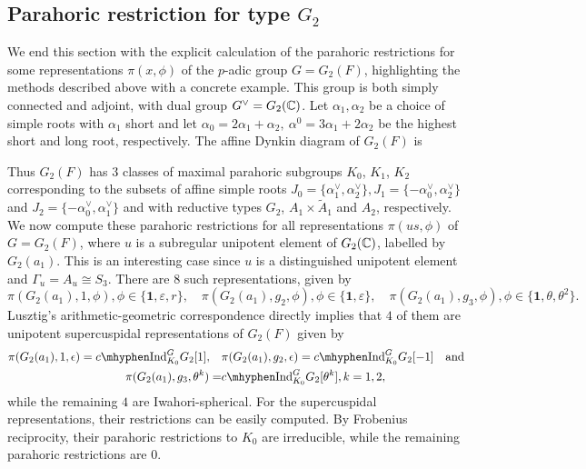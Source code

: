 \subsection{Parahoric restriction for type \texorpdfstring{$G_2$}{PDFstring}}
We end this section with the explicit calculation of the parahoric restrictions for some representations $\pi(x,\phi)$ of the $p$-adic group $G=G_2(F)$, highlighting the methods described above with a concrete example. This group is both simply connected and adjoint, with dual group $G^\vee=G_2(\mathbb{C})$. Let $\alpha_1,\alpha_2$ be a choice of simple roots with $\alpha_1$ short and let $\alpha_0=2\alpha_1+\alpha_2,\ \alpha^0=3\alpha_1+2\alpha_2$ be the highest short and long root, respectively. The affine Dynkin diagram of $G_2(F)$ is 
\begin{center}
\end{center}
Thus $G_2(F)$ has $3$ classes of maximal parahoric subgroups $K_0$, $K_1$, $K_2$ corresponding to the subsets of affine simple roots $J_0=\{\alpha^\vee_1,\alpha^\vee_2\}, J_1=\{-\alpha^\vee_0,\alpha^\vee_2\}$ and $J_2=\{-\alpha^\vee_0,\alpha^\vee_1\}$ and with reductive types $G_2$, $A_1\times \tilde{A}_1$ and $A_2$, respectively. We now compute these parahoric restrictions for all representations $\pi(us,\phi)$ of $G=G_2(F)$, where $u$ is a subregular unipotent element of $G_2(\mathbb{C})$, labelled by $G_2(a_1)$. This is an interesting case since $u$ is a distinguished unipotent element and $\Gamma_u=A_u\cong S_3$. There are $8$ such representations, given by 
$$\pi(G_2(a_1),1,\phi),\phi\in\{\mathbf{1},\varepsilon,r\},\quad\pi(G_2(a_1),g_2,\phi),\phi\in\{\mathbf{1},\varepsilon\},\quad\pi(G_2(a_1),g_3,\phi),\phi\in\{\mathbf{1},\theta,\theta^2\}.$$
Lusztig's arithmetic-geometric correspondence directly implies that $4$ of them are unipotent supercuspidal representations of $G_2(F)$ given by 
\begin{align*}
    \pi(G_2(a_1),1,\epsilon)=\cInd_{K_0}^{G}G_2[1],\quad&\pi(G_2(a_1),g_2,\epsilon)=\cInd_{K_0}^{G}G_2[-1]\quad\text{and}\\
    \quad\pi(G_2(a_1),g_3,\theta^k)=&\cInd_{K_0}^{G}G_2[\theta^k], k=1,2,
\end{align*}
while the remaining $4$ are Iwahori-spherical. 
For the supercuspidal representations, their restrictions can be easily computed. By Frobenius reciprocity, their parahoric restrictions to $K_0$ are irreducible, while the remaining parahoric restrictions are $0$.


